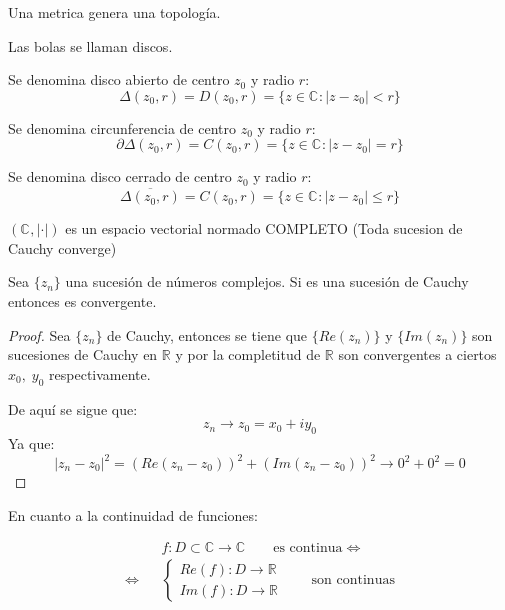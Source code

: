 Una metrica genera una topología.

Las bolas se llaman discos.

\begin{definicion}
  Se denomina disco abierto de centro \(z_0\) y radio \(r\):
  \[ \Delta (z_0, r) = D(z_0,r) = \{z \in \mathbb{C}^{} : |z-z_0|< r\}\]
\end{definicion}
\begin{definicion}[Circuferencia]
  Se denomina circunferencia de centro \(z_0\) y radio \(r\):
  \[ \partial \Delta (z_0, r) = C(z_0,r) = \{z \in \mathbb{C}^{} : |z-z_0| = r\}\]
\end{definicion}
\begin{definicion}
  Se denomina disco cerrado de centro \(z_0\) y radio \(r\):
  \[ \overline{\Delta (z_0, r) }= C(z_0,r) = \{z \in \mathbb{C}^{} : |z-z_0| \leq r\}\]
\end{definicion}

\((\mathbb{C}^{}, |\cdot|)\) es un espacio vectorial normado COMPLETO (Toda sucesion de Cauchy converge)

\begin{teorema}
  Sea \(\{z_n\}\) una sucesión de números complejos. Si es una sucesión de Cauchy entonces es convergente.
  \begin{proof}
    Sea \(\{z_n\}\) de Cauchy, entonces se tiene que \(\{Re(z_n)\}\) y \(\{Im(z_n)\}\) son sucesiones de Cauchy en \(\mathbb{R}\) y por la completitud de \(\mathbb{R}\) son convergentes a ciertos \(x_0, \;y_0\) respectivamente.

    De aquí se sigue que:
    \[z_n \rightarrow z_0 = x_0+iy_0\]
    Ya que:
    \[|z_n-z_0|^2=(Re(z_n-z_0))^2+(Im(z_n-z_0))^2 \rightarrow 0^2+0^2=0 \]

  \end{proof}
\end{teorema}

En cuanto a la continuidad de funciones:

\begin{eqnarray*}
  & & f:D\subset \mathbb{C} \rightarrow \mathbb{C} \qquad \text{es continua} \Leftrightarrow \\
  \Leftrightarrow & & \begin{cases}
    Re(f): D \rightarrow \mathbb{R} \\
    Im(f): D \rightarrow \mathbb{R}
  \end{cases} \qquad \text{son continuas}
\end{eqnarray*}

